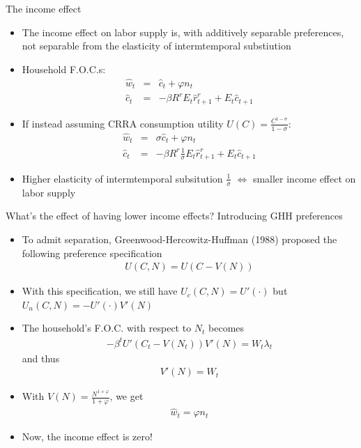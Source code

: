 \documentclass[9pt,xcolor={dvipsnames}]{beamer}
\newcommand{\bit}{\begin{itemize}}
\newcommand{\eit}{\end{itemize}}
\begin{document}
\begin{frame}{The income effect}

\bit
\setlength\itemsep{1.5em}

\item The income effect on labor supply is, with additively separable preferences, not separable from the elasticity of intermtemporal substiution

\item Household F.O.C.s:
\begin{eqnarray}
\hat w_t &=& \hat c_t + \varphi n_t \nonumber \\
\hat c_t &=& - \beta R^{r} E_t \hat r^{r}_{t+1} + E_t \hat {c}_{t+1} \nonumber 
\end{eqnarray}

\item If instead assuming CRRA consumption utility $U(C)=\frac{C^{1-\sigma}}{1-\sigma}$:
\begin{eqnarray}
\hat w_t &=& \sigma \hat c_t + \varphi n_t \nonumber \\
\hat c_t &=& - \beta R^{r} \frac{1}{\sigma}E_t \hat r^{r}_{t+1} + E_t \hat {c}_{t+1} \nonumber 
\end{eqnarray}

\item Higher elasticity of intermtemporal subsitution $\frac{1}{\sigma}$ $\Leftrightarrow$ smaller income effect on labor supply 

\eit

\end{frame}

\begin{frame}{What's the effect of having lower income effects? Introducing GHH preferences}

\bit
\setlength\itemsep{1.5em}

\item To admit separation, Greenwood-Hercowitz-Huffman (1988) proposed the following preference specification
\begin{eqnarray}
U(C,N) = U(C-V(N)) \nonumber
\end{eqnarray}

\item With this specification, we still have $U_c(C, N) = U'(\cdot)$ but $U_n(C, N) = - U'(\cdot)V'(N)$

\item The household's F.O.C. with respect to $N_t$ becomes
\begin{eqnarray}
-\beta^t U'(C_t-V(N_t)) V'(N) = W_t \lambda_t \nonumber
\end{eqnarray}
and thus
\begin{eqnarray}
V'(N) = W_t \nonumber
\end{eqnarray}

\item With $V(N) = \frac{N^{1+\varphi}}{1+\varphi}$, we get
\begin{eqnarray}
\hat w_t = \varphi n_t \nonumber
\end{eqnarray}

\item Now, the income effect is zero!

\eit

\end{frame}
\end{document}

